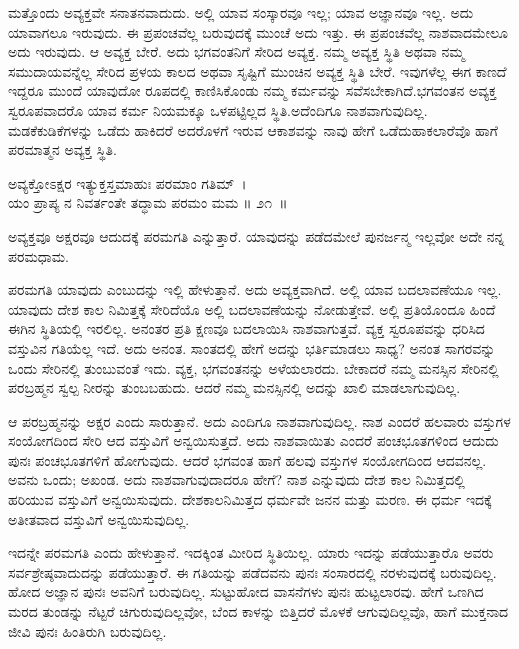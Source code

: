 ಮತ್ತೊಂದು ಅವ್ಯಕ್ತವೇ ಸನಾತನವಾದುದು. ಅಲ್ಲಿ ಯಾವ ಸಂಸ್ಕಾರವೂ ಇಲ್ಲ; ಯಾವ ಅಜ್ಞಾನವೂ ಇಲ್ಲ. ಅದು ಯಾವಾಗಲೂ ಇರುವುದು. ಈ ಪ್ರಪಂಚವೆಲ್ಲ ಬರುವುದಕ್ಕೆ ಮುಂಚೆ ಅದು ಇತ್ತು. ಈ ಪ್ರಪಂಚವೆಲ್ಲ ನಾಶವಾದಮೇಲೂ ಅದು ಇರುವುದು. ಆ ಅವ್ಯಕ್ತ ಬೇರೆ. ಅದು ಭಗವಂತನಿಗೆ ಸೇರಿದ ಅವ್ಯಕ್ತ. ನಮ್ಮ ಅವ್ಯಕ್ತ ಸ್ಥಿತಿ ಅಥವಾ ನಮ್ಮ ಸಮುದಾಯವನ್ನೆಲ್ಲ ಸೇರಿದ ಪ್ರಳಯ ಕಾಲದ ಅಥವಾ ಸೃಷ್ಟಿಗೆ ಮುಂಚಿನ ಅವ್ಯಕ್ತ ಸ್ಥಿತಿ ಬೇರೆ. ಇವುಗಳೆಲ್ಲ ಈಗ ಕಾಣದೆ ಇದ್ದರೂ ಮುಂದೆ ಯಾವುದೋ ರೂಪದಲ್ಲಿ ಕಾಣಿಸಿಕೊಂಡು ನಮ್ಮ ಕರ್ಮವನ್ನು ಸವೆಸಬೇಕಾಗಿದೆ.\break ಭಗವಂತನ ಅವ್ಯಕ್ತ ಸ್ವರೂಪವಾದರೊ ಯಾವ ಕರ್ಮ ನಿಯಮಕ್ಕೂ ಒಳಪಟ್ಟಿಲ್ಲದ ಸ್ಥಿತಿ.\break ಅದೆಂದಿಗೂ ನಾಶವಾಗುವುದಿಲ್ಲ. ಮಡಕೆಕುಡಿಕೆಗಳನ್ನು ಒಡೆದು ಹಾಕಿದರೆ ಅದರೊಳಗೆ ಇರುವ ಆಕಾಶವನ್ನು ನಾವು ಹೇಗೆ ಒಡೆದುಹಾಕಲಾರೆವೊ ಹಾಗೆ ಪರಮಾತ್ಮನ ಅವ್ಯಕ್ತ ಸ್ಥಿತಿ.

\begin{shloka}
ಅವ್ಯಕ್ತೋಽಕ್ಷರ ಇತ್ಯುಕ್ತಸ್ತಮಾಹುಃ ಪರಮಾಂ ಗತಿಮ್~।\\ಯಂ ಪ್ರಾಪ್ಯ ನ ನಿವರ್ತಂತೇ ತದ್ಧಾಮ ಪರಮಂ ಮಮ \hfill॥ ೨೧~॥
\end{shloka}

\newpage

\begin{artha}
ಅವ್ಯಕ್ತವೂ ಅಕ್ಷರವೂ ಆದುದಕ್ಕೆ ಪರಮಗತಿ ಎನ್ನುತ್ತಾರೆ. ಯಾವುದನ್ನು ಪಡೆದಮೇಲೆ ಪುನರ್ಜನ್ಮ ಇಲ್ಲವೋ ಅದೇ ನನ್ನ ಪರಮಧಾಮ.
\end{artha}

ಪರಮಗತಿ ಯಾವುದು ಎಂಬುದನ್ನು ಇಲ್ಲಿ ಹೇಳುತ್ತಾನೆ. ಅದು ಅವ್ಯಕ್ತವಾಗಿದೆ. ಅಲ್ಲಿ ಯಾವ ಬದಲಾವಣೆಯೂ ಇಲ್ಲ. ಯಾವುದು ದೇಶ ಕಾಲ ನಿಮಿತ್ತಕ್ಕೆ ಸೇರಿದೆಯೊ ಅಲ್ಲಿ ಬದಲಾವಣೆಯನ್ನು ನೋಡುತ್ತೇವೆ. ಅಲ್ಲಿ ಪ್ರತಿಯೊಂದೂ ಹಿಂದೆ ಈಗಿನ ಸ್ಥಿತಿಯಲ್ಲಿ ಇರಲಿಲ್ಲ. ಅನಂತರ ಪ್ರತಿ ಕ್ಷಣವೂ ಬದಲಾಯಿಸಿ ನಾಶವಾಗುತ್ತವೆ. ವ್ಯಕ್ತ ಸ್ವರೂಪವನ್ನು ಧರಿಸಿದ ವಸ್ತುವಿನ ಗತಿಯೆಲ್ಲ ಇದೆ. ಅದು ಅನಂತ. ಸಾಂತದಲ್ಲಿ ಹೇಗೆ ಅದನ್ನು ಭರ್ತಿಮಾಡಲು ಸಾಧ್ಯ? ಅನಂತ ಸಾಗರವನ್ನು ಒಂದು ಸೇರಿನಲ್ಲಿ ತುಂಬುವಂತೆ ಇದು. ವ್ಯಕ್ತ, ಭಗವಂತನನ್ನು ಅಳೆಯಲಾರದು. ಬೇಕಾದರೆ ನಮ್ಮ ಮನಸ್ಸಿನ ಸೇರಿನಲ್ಲಿ ಪರಬ್ರಹ್ಮನ ಸ್ವಲ್ಪ ನೀರನ್ನು ತುಂಬಬಹುದು. ಆದರೆ ನಮ್ಮ ಮನಸ್ಸಿನಲ್ಲಿ ಅದನ್ನು ಖಾಲಿ ಮಾಡಲಾಗುವುದಿಲ್ಲ.

ಆ ಪರಬ್ರಹ್ಮನನ್ನು ಅಕ್ಷರ ಎಂದು ಸಾರುತ್ತಾನೆ. ಅದು ಎಂದಿಗೂ ನಾಶವಾಗುವುದಿಲ್ಲ. ನಾಶ ಎಂದರೆ ಹಲವಾರು ವಸ್ತುಗಳ ಸಂಯೋಗದಿಂದ ಸೇರಿ ಆದ ವಸ್ತುವಿಗೆ ಅನ್ವಯಿಸುತ್ತದೆ. ಅದು ನಾಶವಾಯಿತು ಎಂದರೆ ಪಂಚಭೂತಗಳಿಂದ ಆದುದು ಪುನಃ ಪಂಚಭೂತಗಳಿಗೆ ಹೋಗುವುದು. ಆದರೆ ಭಗವಂತ ಹಾಗೆ ಹಲವು ವಸ್ತುಗಳ ಸಂಯೋಗದಿಂದ ಆದವನಲ್ಲ. ಅವನು ಒಂದು; ಅಖಂಡ. ಅದು ನಾಶವಾಗುವುದಾದರೂ ಹೇಗೆ? ನಾಶ ಎನ್ನುವುದು ದೇಶ ಕಾಲ ನಿಮಿತ್ತದಲ್ಲಿ ಹರಿಯುವ ವಸ್ತುವಿಗೆ ಅನ್ವಯಿಸುವುದು. ದೇಶಕಾಲನಿಮಿತ್ತದ ಧರ್ಮವೇ ಜನನ ಮತ್ತು ಮರಣ. ಈ ಧರ್ಮ ಇದಕ್ಕೆ ಅತೀತವಾದ ವಸ್ತುವಿಗೆ ಅನ್ವಯಿಸುವುದಿಲ್ಲ.

ಇದನ್ನೇ ಪರಮಗತಿ ಎಂದು ಹೇಳುತ್ತಾನೆ. ಇದಕ್ಕಿಂತ ಮೀರಿದ ಸ್ಥಿತಿಯಿಲ್ಲ. ಯಾರು ಇದನ್ನು ಪಡೆಯುತ್ತಾರೊ ಅವರು ಸರ್ವಶ್ರೇಷ್ಠವಾದುದನ್ನು ಪಡೆಯುತ್ತಾರೆ. ಈ ಗತಿಯನ್ನು ಪಡೆದವನು ಪುನಃ ಸಂಸಾರದಲ್ಲಿ ನರಳುವುದಕ್ಕೆ ಬರುವುದಿಲ್ಲ. ಹೋದ ಅಜ್ಞಾನ ಪುನಃ ಅವನಿಗೆ ಬರುವುದಿಲ್ಲ. ಸುಟ್ಟುಹೋದ ವಾಸನೆಗಳು ಪುನಃ ಹುಟ್ಟಲಾರವು. ಹೇಗೆ ಒಣಗಿದ ಮರದ ತುಂಡನ್ನು ನೆಟ್ಟರೆ ಚಿಗುರುವುದಿಲ್ಲವೋ, ಬೆಂದ ಕಾಳನ್ನು ಬಿತ್ತಿದರೆ ಮೊಳಕೆ ಆಗುವುದಿಲ್ಲವೊ, ಹಾಗೆ ಮುಕ್ತನಾದ ಜೀವಿ ಪುನಃ ಹಿಂತಿರುಗಿ ಬರುವುದಿಲ್ಲ.

